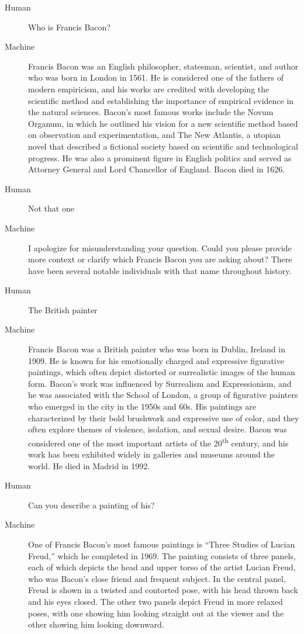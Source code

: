 \begin{description}
\item[Human] Who is Francis Bacon?
\item[Machine] Francis Bacon was an English philosopher, statesman, scientist,
    and author who was born in London in 1561. He is considered one of the
    fathers of modern empiricism, and his works are credited with developing the
    scientific method and establishing the importance of empirical evidence in
    the natural sciences. Bacon's most famous works include the Novum Organum,
    in which he outlined his vision for a new scientific method based on
    observation and experimentation, and The New Atlantis, a utopian novel that
    described a fictional society based on scientific and technological
    progress. He was also a prominent figure in English politics and served as
    Attorney General and Lord Chancellor of England. Bacon died in 1626.
\item[Human] Not that one
\item[Machine] I apologize for misunderstanding your question. Could you please
    provide more context or clarify which Francis Bacon you are asking about?
    There have been several notable individuals with that name throughout
    history.
\item[Human] The British painter
\item[Machine] Francis Bacon was a British painter who was born in Dublin,
    Ireland in 1909. He is known for his emotionally charged and expressive
    figurative paintings, which often depict distorted or surrealistic images of
    the human form. Bacon's work was influenced by Surrealism and Expressionism,
    and he was associated with the School of London, a group of figurative
    painters who emerged in the city in the 1950s and 60s. His paintings are
    characterized by their bold brushwork and expressive use of color, and they
    often explore themes of violence, isolation, and sexual desire. Bacon was
    considered one of the most important artists of the 20\textsuperscript{th}
    century, and his work has been exhibited widely in galleries and museums
    around the world. He died in Madrid in 1992.
\item[Human] Can you describe a painting of his?
\item[Machine] One of Francis Bacon's most famous paintings is ``Three Studies
    of Lucian Freud,'' which he completed in 1969. The painting consists of
    three panels, each of which depicts the head and upper torso of the artist
    Lucian Freud, who was Bacon's close friend and frequent subject. In the
    central panel, Freud is shown in a twisted and contorted pose, with his head
    thrown back and his eyes closed. The other two panels depict Freud in more
    relaxed poses, with one showing him looking straight out at the viewer and
    the other showing him looking downward.


\end{description}
